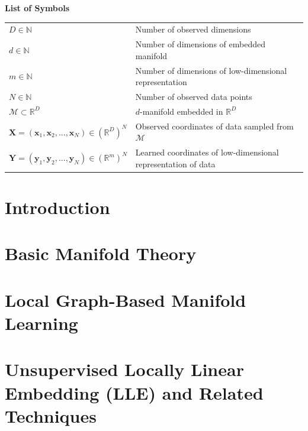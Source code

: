 \documentclass[12pt]{article}
\newcommand{\mani}{\mathcal{M}}
\newcommand{\N}{\mathbb{N}}
\newcommand{\R}{\mathbb{R}}
\newcommand{\RD}{\mathbb{R}^D}
\begin{document}
\tableofcontents
\newpage

\Large
\noindent
\textbf{List of Symbols}
\vspace{0.5cm} \\
\noindent
\normalsize

\begin{tabularx}{\textwidth}{ 
  >{\raggedleft\arraybackslash}X 
  >{\raggedright\arraybackslash}X}
  $D \in \N$ & Number of observed dimensions \\
  $d \in \N$ & Number of dimensions of embedded manifold \\
  $m \in \N$ & Number of dimensions of low-dimensional representation \\
  $N \in \N$ & Number of observed data points \\
  $\mani \subset \RD$ & $d$-manifold embedded in $\RD$ \\
  $\bm{X} = (\bm{x}_1, \bm{x}_2, ..., \bm{x}_N) \in (\RD)^N$ & Observed 
  coordinates of data sampled from $\mani$ \\
  $\bm{Y} = (\bm{y}_1, \bm{y}_2, ..., \bm{y}_N) \in (\R^m)^N$ & Learned 
  coordinates of low-dimensional representation of data
\end{tabularx}

\newpage

\listoffigures
\newpage
\listoftables
\newpage


    
\section{Introduction}
\label{intro}


\section{Basic Manifold Theory}
\label{math}


\section{Local Graph-Based Manifold Learning}
\label{lgb-mani-learn}


\section{Unsupervised Locally Linear Embedding (LLE) and Related Techniques}
\label{unsupervised-techniques}

\end{document}
